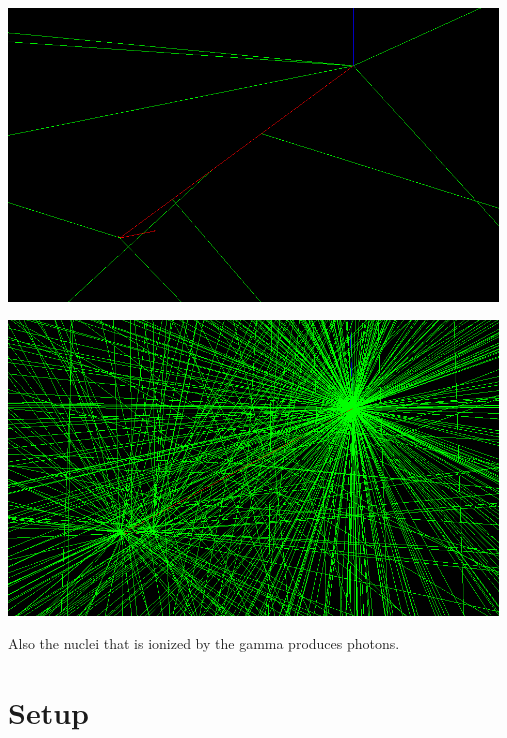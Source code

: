 \documentclass[12pt, a4paper,titlepage]{article}
\numberwithin{equation}{section}
\numberwithin{figure}{section}
\begin{document}
\includegraphics[width=130.0mm]{images/secondary.png}


\includegraphics[width=130.0mm]{images/secondary2.png}

Also the nuclei that is ionized by the gamma produces photons.

\section{Setup}
\end{document}
